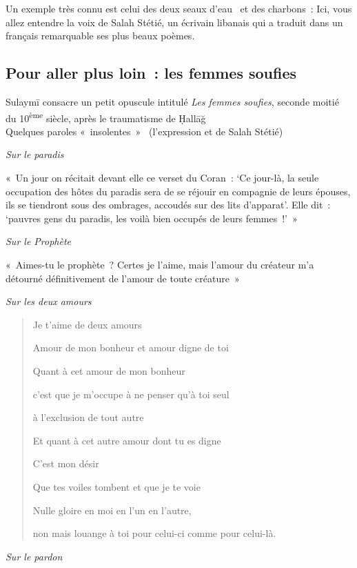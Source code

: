 Un exemple très connu est celui des deux seaux d'eau~ et des charbons~:
Ici, vous allez entendre la voix de Salah Stétié, un écrivain libanais
qui a traduit dans un français remarquable ses plus beaux poèmes.


\subsection{Pour aller plus loin~: les femmes soufies}

Sulaymī consacre un petit opuscule intitulé \emph{Les femmes soufies},
seconde moitié du 10\textsuperscript{ème} siècle, après le traumatisme
de Ḥallāğ \\


Quelques paroles «~insolentes~»~ (l'expression et de Salah Stétié)

\emph{Sur le paradis}

«~Un jour on récitait devant elle ce verset du Coran~: `Ce jour-là, la
seule occupation des hôtes du paradis sera de se réjouir en compagnie de
leurs épouses, ils se tiendront sous des ombrages, accoudés sur des lits
d'apparat'. Elle dit~: `pauvres gens du paradis, les voilà bien occupés
de leurs femmes~!'~»

\emph{Sur le Prophète}~

«~Aimes-tu le prophète~? Certes je l'aime, mais l'amour du créateur m'a
détourné définitivement de l'amour de toute créature~»

\emph{Sur les deux amours}

\begin{quote}
Je t'aime de deux amours

Amour de mon bonheur et amour digne de toi

Quant à cet amour de mon bonheur

c'est que je m'occupe à ne penser qu'à toi seul

à l'exclusion de tout autre

Et quant à cet autre amour dont tu es digne

C'est mon désir

Que tes voiles tombent et que je te voie

Nulle gloire en moi en l'un en l'autre,

non mais louange à toi pour celui-ci comme pour celui-là.
\end{quote}

\emph{Sur le pardon}


